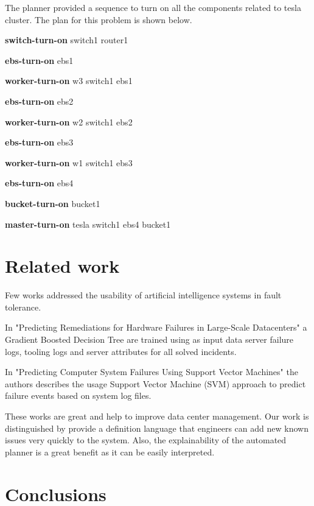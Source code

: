 \documentclass[letterpaper]{article}
\begin{document}
The planner provided a sequence to turn on all the components related to tesla cluster. The plan for this problem is shown below.

\textbf{switch-turn-on} switch1 router1

\textbf{ebs-turn-on} ebs1

\textbf{worker-turn-on} w3 switch1 ebs1

\textbf{ebs-turn-on} ebs2

\textbf{worker-turn-on} w2 switch1 ebs2

\textbf{ebs-turn-on} ebs3

\textbf{worker-turn-on} w1 switch1 ebs3

\textbf{ebs-turn-on} ebs4

\textbf{bucket-turn-on} bucket1

\textbf{master-turn-on} tesla switch1 ebs4 bucket1


\section{Related work}\label{sec:related-work}

Few works addressed the usability of artificial intelligence systems in fault tolerance.

In "Predicting Remediations for Hardware Failures in Large-Scale Datacenters" \cite{lin2020predicting} a Gradient Boosted Decision Tree are trained using as input data server failure logs, tooling logs and server attributes for all solved incidents.

In "Predicting Computer System Failures Using Support Vector Machines" \cite{10.5555/1855886.1855891} the authors describes the usage Support Vector Machine (SVM) approach to predict failure events based on system log files.

These works are great and help to improve data center management. Our work is distinguished by provide a definition language that engineers can add new known issues very quickly to the system. Also, the explainability of the automated planner is a great benefit as it can be easily interpreted.

\section{Conclusions}\label{sec:conclusions}
\end{document}
